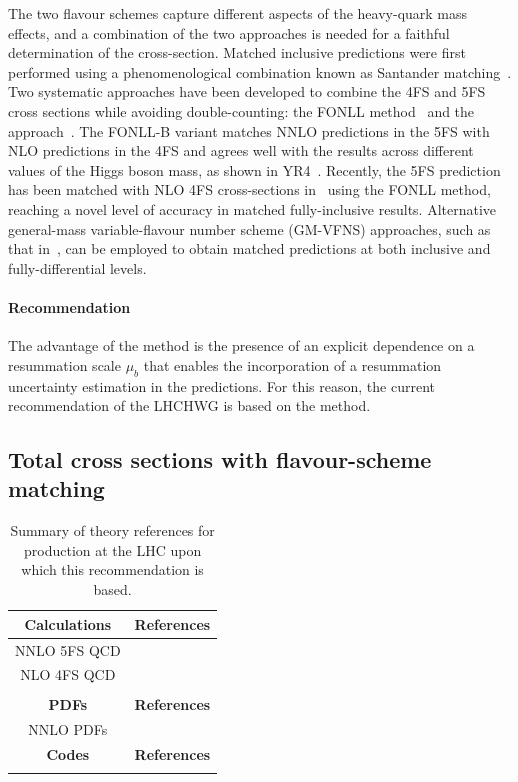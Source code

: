 The two flavour schemes capture different aspects of the heavy-quark mass effects, and a combination of the two approaches is needed for a faithful determination of the cross-section. Matched inclusive predictions were first performed using a phenomenological combination known as Santander matching~\cite{Harlander:2011aa}. Two systematic approaches have been developed to combine the 4FS and 5FS cross sections while avoiding double-counting: the FONLL method~\cite{Forte:2015hba,Forte:2016sja} and the \nlonnllpart{} approach~\cite{Bonvini:2015pxa,Bonvini:2016fgf}. The FONLL-B variant matches NNLO predictions in the 5FS with NLO predictions in the 4FS and agrees well with the \nlonnllpart{} results across different values of the Higgs boson mass, as shown in YR4~\cite{LHCHiggsCrossSectionWorkingGroup:2016ypw}. Recently, the \nnnlo{} 5FS prediction has been matched with NLO 4FS cross-sections in~ using the FONLL method, reaching a novel level of accuracy in matched fully-inclusive results. Alternative general-mass variable-flavour number scheme (GM-VFNS) approaches, such as that in~, can be employed to obtain matched predictions at both inclusive and fully-differential levels.

\paragraph{Recommendation}
The advantage of the \nlonnllpart{} method is the presence of an explicit dependence on a resummation scale $\mu_b$ that enables the incorporation of a resummation uncertainty estimation in the predictions. For this reason, the current recommendation of the LHCHWG is based on the \nlonnllpart{} method.

\subsection{Total cross sections with flavour-scheme matching}

\begin{table}[h!]
\centering
\begin{tabular}{c|c}
\hline
\textbf{Calculations} & \textbf{References} \\ 
\hline
NNLO 5FS QCD & \cite{Harlander:2003ai} \\
NLO 4FS QCD  & \cite{Dittmaier:2003ej,Dawson:2003kb} \\
\nlonnllpart{} & \cite{Bonvini:2015pxa,Bonvini:2016fgf} \\
\hline
\textbf{PDFs} & \textbf{References} \\
\hline
NNLO PDFs & \cite{Butterworth:2015oua,Bonvini:2016fgf}\\
\hline
\textbf{Codes} & \textbf{References} \\ 
\hline
\nlonnllpart{} & \cite{Bonvini:2016fgf}
\end{tabular}
\caption{Summary of theory references for \bbH{} production at the LHC upon which this recommendation is based.
}
\label{tab:bbf_cite}
\end{table}

